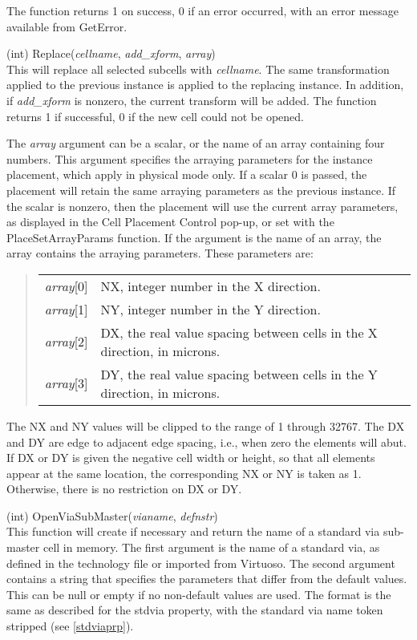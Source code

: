 \begin{description}
The function returns 1 on success, 0 if an error occurred, with an
error message available from {\vt GetError}.

\item{(int) \vt Replace({\it cellname\/}, {\it add\_xform\/}, {\it array\/})}\\
This will replace all selected subcells with {\it cellname\/}.  The same
transformation applied to the previous instance is applied to the
replacing instance.  In addition, if {\it add\_xform\/} is nonzero, the
current transform will be added.  The function returns 1 if
successful, 0 if the new cell could not be opened.

The {\it array} argument can be a scalar, or the name of an array
containing four numbers.  This argument specifies the arraying
parameters for the instance placement, which apply in physical mode
only.  If a scalar 0 is passed, the placement will retain the same
arraying parameters as the previous instance.  If the scalar is
nonzero, then the placement will use the current array parameters, as
displayed in the {\cb Cell Placement Control} pop-up, or set with the
{\vt PlaceSetArrayParams} function.  If the argument is the name of an
array, the array contains the arraying parameters.  These parameters
are:
\begin{quote}
\begin{tabular}{ll}
{\it array\/}[0] & NX, integer number in the X direction.\\
{\it array\/}[1] & NY, integer number in the Y direction.\\
{\it array\/}[2] & DX, the real value spacing between cells in
  the X direction, in microns.\\
{\it array\/}[3] & DY, the real value spacing between cells in
  the Y direction, in microns.\\
\end{tabular}
\end{quote}

The NX and NY values will be clipped to the range of 1 through 32767. 
The DX and DY are edge to adjacent edge spacing, i.e., when zero the
elements will abut.  If DX or DY is given the negative cell width or
height, so that all elements appear at the same location, the
corresponding NX or NY is taken as 1.  Otherwise, there is no
restriction on DX or DY.

\item{(int) \vt OpenViaSubMaster({\it vianame\/}, {\it defnstr\/})}\\
This function will create if necessary and return the name of a
standard via sub-master cell in memory.  The first argument is the
name of a standard via, as defined in the technology file or imported
from Virtuoso.  The second argument contains a string that specifies
the parameters that differ from the default values.  This can be null
or empty if no non-default values are used.  The format is the same as
described for the {\et stdvia} property, with the standard via name
token stripped (see \ref{stdviaprp}).


\end{description}
